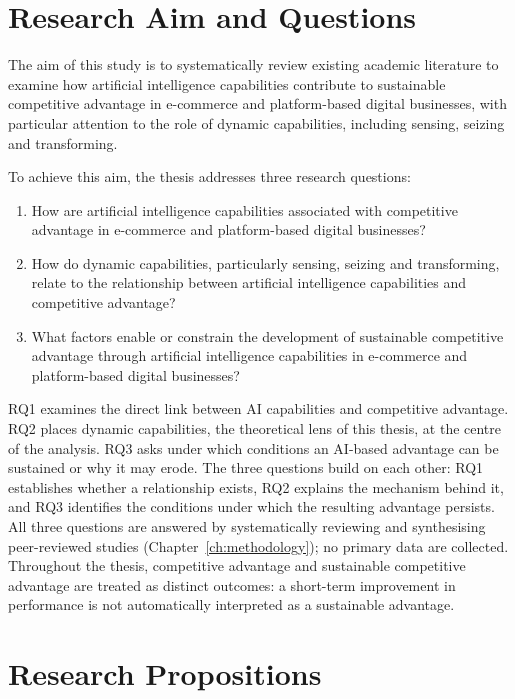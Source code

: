 \section{Research Aim and Questions}
\label{sec:objectives}

The aim of this study is to systematically review existing academic literature to examine how artificial intelligence capabilities contribute to sustainable competitive advantage in e-commerce and platform-based digital businesses, with particular attention to the role of dynamic capabilities, including sensing, seizing and transforming.

To achieve this aim, the thesis addresses three research questions:
\begin{enumerate}[label=RQ\arabic*:, leftmargin=1.5cm]
  \item How are artificial intelligence capabilities associated with competitive advantage in e-commerce and platform-based digital businesses?
  \item How do dynamic capabilities, particularly sensing, seizing and transforming, relate to the relationship between artificial intelligence capabilities and competitive advantage?
  \item What factors enable or constrain the development of sustainable competitive advantage through artificial intelligence capabilities in e-commerce and platform-based digital businesses?
\end{enumerate}

RQ1 examines the direct link between AI capabilities and competitive advantage. RQ2 places dynamic capabilities, the theoretical lens of this thesis, at the centre of the analysis. RQ3 asks under which conditions an AI-based advantage can be sustained or why it may erode. The three questions build on each other: RQ1 establishes whether a relationship exists, RQ2 explains the mechanism behind it, and RQ3 identifies the conditions under which the resulting advantage persists. All three questions are answered by systematically reviewing and synthesising peer-reviewed studies (Chapter~\ref{ch:methodology}); no primary data are collected. Throughout the thesis, competitive advantage and sustainable competitive advantage are treated as distinct outcomes: a short-term improvement in performance is not automatically interpreted as a sustainable advantage.

\section{Research Propositions}
\label{sec:propositions}

